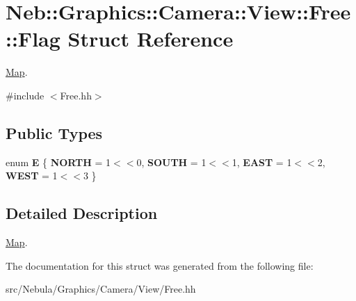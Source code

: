 \hypertarget{structNeb_1_1Graphics_1_1Camera_1_1View_1_1Free_1_1Flag}{\section{\-Neb\-:\-:\-Graphics\-:\-:\-Camera\-:\-:\-View\-:\-:\-Free\-:\-:\-Flag \-Struct \-Reference}
\label{structNeb_1_1Graphics_1_1Camera_1_1View_1_1Free_1_1Flag}
}


\hyperlink{classNeb_1_1Map}{\-Map}.  




{\ttfamily \#include $<$\-Free.\-hh$>$}

\subsection*{\-Public \-Types}
\begin{DoxyCompactItemize}
\item 
enum {\bfseries \-E} \{ {\bfseries \-N\-O\-R\-T\-H} =  1$<$$<$0, 
{\bfseries \-S\-O\-U\-T\-H} =  1$<$$<$1, 
{\bfseries \-E\-A\-S\-T} =  1$<$$<$2, 
{\bfseries \-W\-E\-S\-T} =  1$<$$<$3
 \}
\end{DoxyCompactItemize}


\subsection{\-Detailed \-Description}
\hyperlink{classNeb_1_1Map}{\-Map}. 

\-The documentation for this struct was generated from the following file\-:\begin{DoxyCompactItemize}
\item 
src/\-Nebula/\-Graphics/\-Camera/\-View/\-Free.\-hh\end{DoxyCompactItemize}
